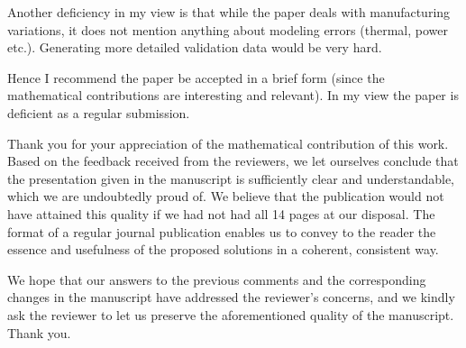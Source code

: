 \begin{reviewer}
Another deficiency in my view is that while the paper deals with
manufacturing variations, it does not mention anything about modeling errors
(thermal, power etc.). Generating more detailed validation data would be very
hard.
\end{reviewer}

\begin{authors}
\begin{actions}
\end{actions}
\end{authors}

\begin{reviewer}
Hence I recommend the paper be accepted in a brief form (since the
mathematical contributions are interesting and relevant). In my view the paper
is deficient as a regular submission.
\end{reviewer}

\begin{authors}
Thank you for your appreciation of the mathematical contribution of this work.
Based on the feedback received from the reviewers, we let ourselves conclude
that the presentation given in the manuscript is sufficiently clear and
understandable, which we are undoubtedly proud of. We believe that the
publication would not have attained this quality if we had not had all 14 pages
at our disposal. The format of a regular journal publication enables us to
convey to the reader the essence and usefulness of the proposed solutions in a
coherent, consistent way.

We hope that our answers to the previous comments and the corresponding changes
in the manuscript have addressed the reviewer's concerns, and we kindly ask the
reviewer to let us preserve the aforementioned quality of the manuscript. Thank
you.
\end{authors}
